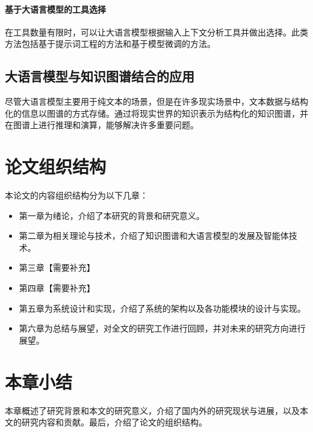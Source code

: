 \paragraph{基于大语言模型的工具选择} 
在工具数量有限时，可以让大语言模型根据输入上下文分析工具并做出选择。此类方法包括基于提示词工程的方法和基于模型微调的方法。

\subsection{大语言模型与知识图谱结合的应用}
尽管大语言模型主要用于纯文本的场景，但是在许多现实场景中，文本数据与结构化的信息以图谱的方式存储。通过将现实世界的知识表示为结构化的知识图谱，并在图谱上进行推理和演算，能够解决许多重要问题\cite{Liu2024}。

\section{论文组织结构}
本论文的内容组织结构分为以下几章：

\begin{itemize}
    \item 第一章为绪论，介绍了本研究的背景和研究意义。
    \item 第二章为相关理论与技术，介绍了知识图谱和大语言模型的发展及智能体技术。
    \item 第三章【需要补充】
    \item 第四章【需要补充】
    \item 第五章为系统设计和实现，介绍了系统的架构以及各功能模块的设计与实现。
    \item 第六章为总结与展望，对全文的研究工作进行回顾，并对未来的研究方向进行展望。
\end{itemize}

\section{本章小结}
本章概述了研究背景和本文的研究意义，介绍了国内外的研究现状与进展，以及本文的研究内容和贡献。最后，介绍了论文的组织结构。